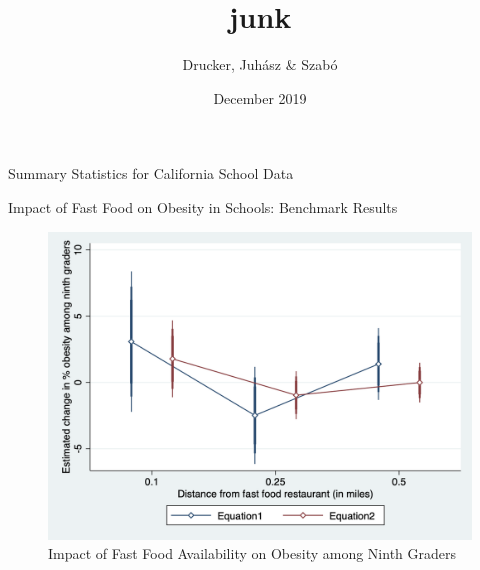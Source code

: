 \documentclass{article}
\title{junk}
\author{Drucker, Juhász \& Szabó}
\date{December 2019}
\begin{document}
\begin{table}[h]
\caption{Summary Statistics for California School Data}

\end{table}

\newpage

\begin{table}[h]
\caption{Impact of Fast Food on Obesity in Schools: Benchmark Results}

\end{table}

\newpage

\begin{figure}[b]
\caption{Impact of Fast Food Availability on Obesity among Ninth Graders}
\includegraphics[scale=1]{../figures/figure1A.png}
\end{figure}
\end{document}
